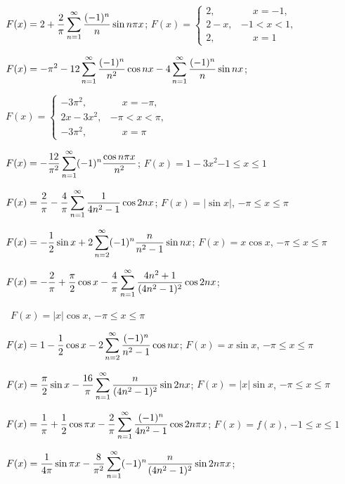 \medskip

$F(x)=\displaystyle2+\frac{2}{\pi}\sum_{n=1}^{\infty}\frac{(-1)^{n}}{n}\sin n\pi x$;  \quad
$F(x)=
\left\{\begin{array}{cl}
2,&\phantom{-}x=-1,\\2-x,&-1<x<1,\\2,&\phantom{-}x=1
\end{array}\right.$

$F(x)=\displaystyle-\pi^{2}-12\sum_{n=1}^{\infty}\frac{(-1)^{n}}{n^{2}}\cos nx
-4\sum_{n=1}^{\infty}\frac{(-1)^{n}}{n}\sin nx$;  \quad

\quad $F(x)=
\left\{\begin{array}{cl}
-3\pi^{2},&\phantom{-}x=-\pi,\\2x-3x^{2},&-\pi<x<\pi,\\
-3\pi^{2},&\phantom{-}x=\pi
\end{array}\right.$

$F(x)=-\displaystyle\frac{12}{\pi^{2}}\sum_{n=1}^{\infty}(-1)^{n}\frac{\cos n\pi x}{n^{2}}$;  \quad $F(x)=1-3x^{2}$\quad$-1\le x\le1$

$F(x)=\displaystyle\frac{2}{\pi}-\frac{4}{\pi}\sum_{n=1}^{\infty}\frac{1}{4n^{2}-1}\cos2nx$;
\quad $F(x)=|\sin x|$, $-\pi\le x\le\pi$

 $F(x)=\displaystyle-\frac{1}{2}\sin x+2\sum_{n=2}^{\infty}(-1)^{n}
\frac{n}{n^{2}-1}\sin nx$;  \quad
$F(x)=x\cos x$, $-\pi\le x\le\pi$

$F(x)=\displaystyle-\frac{2}{\pi}+\frac{\pi}{2}\cos x-\frac{4}{\pi}
\sum_{n=1}^{\infty}\frac{4n^{2}+1}{(4n^{2}-1)^{2}}\cos2nx$;

\quad\,  $F(x)=|x|\cos x$, $-\pi\le x\le\pi$

$F(x)=\displaystyle1-\frac{1}{2}\cos x-2\sum_{n=2}^{\infty}\frac{(-1)^{n}}{n^{2}-1}\cos
nx$;  \quad $F(x)=x\sin x$, $-\pi\le x\le\pi$

$F(x)=\displaystyle\frac{\pi}{2}\sin x-\frac{16}{\pi}
\sum_{n=1}^{\infty}\frac{n}{(4n^{2}-1)^{2}}\sin2nx$;  \quad
 $F(x)=|x|\sin x$, $-\pi\le x\le\pi$

$F(x)=\displaystyle\frac{1}{\pi}+\frac{1}{2}\cos\pi x-\frac{2}{\pi}\sum_{n=1}^{\infty}
\frac{(-1)^{n}}{4n^{2}-1}\cos2n\pi x$;
\quad $F(x)=f(x)$, $-1\le x\le1$

$F(x)=\displaystyle{\frac{1}{4\pi}\sin\pi x-\frac{8}{\pi^{2}}\sum_{n=1}^{\infty}
(-1)^{n}\frac{n}{(4n^{2}-1)^{2}}\sin2n\pi x}$;

